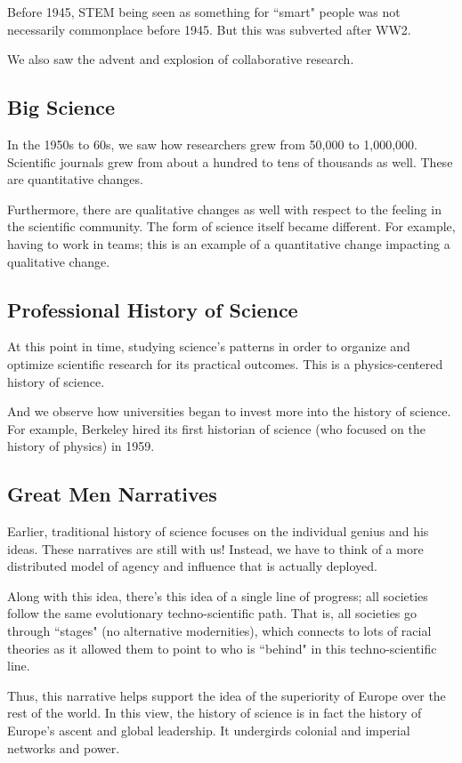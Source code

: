 \documentclass[openany]{book}
\begin{document}
Before 1945, STEM being seen as something for ``smart" people was not necessarily commonplace before 1945. But this was subverted after WW2.

We also saw the advent and explosion of collaborative research.

\subsection{Big Science}
In the 1950s to 60s, we saw how researchers grew from 50,000 to 1,000,000. Scientific journals grew from about a hundred to tens of thousands as well. These are quantitative changes.

Furthermore, there are qualitative changes as well with respect to the feeling in the scientific community. The form of science itself became different. For example, having to work in teams; this is an example of a quantitative change impacting a qualitative change.

\subsection{Professional History of Science}
At this point in time, studying science's patterns in order to organize and optimize scientific research for its practical outcomes. This is a physics-centered history of science.

And we observe how universities began to invest more into the history of science. For example, Berkeley hired its first historian of science (who focused on the history of physics) in 1959.

\subsection{Great Men Narratives}
Earlier, traditional history of science focuses on the individual genius and his ideas. These narratives are still with us! Instead, we have to think of a more distributed model of agency and influence that is actually deployed.

Along with this idea, there's this idea of a single line of progress; all societies follow the same evolutionary techno-scientific path. That is, all societies go through ``stages" (no alternative modernities), which connects to lots of racial theories as it allowed them to point to who is ``behind" in this techno-scientific line.

Thus, this narrative helps support the idea of the superiority of Europe over the rest of the world. In this view, the history of science is in fact the history of Europe's ascent and global leadership. It undergirds colonial and imperial networks and power.
\end{document}

